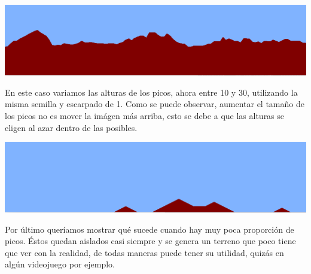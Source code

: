 \begin{center}
\includegraphics[scale=0.4]{imagenes/300-200-10-30-1-123456.png} 
\end{center}
En este caso variamos las alturas de los picos, ahora entre 10 y 30, utilizando la misma semilla y escarpado de 1. Como se puede observar, aumentar el tamaño de los picos no es mover la imágen más arriba, esto se debe a que las alturas se eligen al azar dentro de las posibles.

\begin{center}
\includegraphics[scale=0.4]{imagenes/300-10-1-10-1-123456.png} 
\end{center}
Por último queríamos mostrar qué sucede cuando hay muy poca proporción de picos. Éstos quedan aislados casi siempre y se genera un terreno que poco tiene que ver con la realidad, de todas maneras puede tener su utilidad, quizás en algún videojuego por ejemplo.